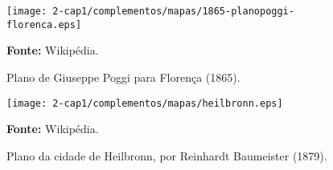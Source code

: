 \begin{figure}[!htp]
\centering
\texttt{[image: 2-cap1/complementos/mapas/1865-planopoggi-florenca.eps]}{\par \footnotesize \textbf{Fonte:} Wikipédia. \par}
\label{fig:florenca1865} 
\caption{Plano de Giuseppe Poggi para Florença (1865).}
\end{figure}

\begin{figure}[!htp]
\centering
\texttt{[image: 2-cap1/complementos/mapas/heilbronn.eps]}{\par \footnotesize \textbf{Fonte:} Wikipédia. \par}
\label{fig:heilbronn1879} 
\caption{Plano da cidade de Heilbronn, por Reinhardt Baumeister (1879).}
\end{figure}

